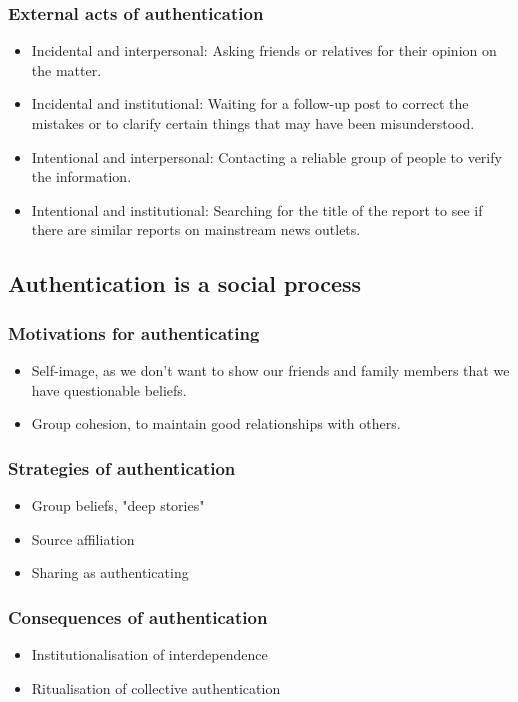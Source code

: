 \documentclass[11pt]{article}
\begin{document}
\subsubsection{External acts of authentication}
\label{sec:org8efaaed}
\begin{itemize}
\item Incidental and interpersonal: Asking friends or relatives for their opinion on the matter.
\item Incidental and institutional: Waiting for a follow-up post to correct the mistakes or to clarify certain things that may have been misunderstood.
\item Intentional and interpersonal: Contacting a reliable group of people to verify the information.
\item Intentional and institutional: Searching for the title of the report to see if there are similar reports on mainstream news outlets.
\end{itemize}
\subsection{Authentication is a social process}
\label{sec:orgf66a9f2}

\subsubsection{Motivations for authenticating}
\label{sec:org5487a06}
\begin{itemize}
\item Self-image, as we don't want to show our friends and family members that we have questionable beliefs.
\item Group cohesion, to maintain good relationships with others.
\end{itemize}
\subsubsection{Strategies of authentication}
\label{sec:org873158e}
\begin{itemize}
\item Group beliefs, "deep stories"
\item Source affiliation
\item Sharing as authenticating
\end{itemize}
\subsubsection{Consequences of authentication}
\label{sec:org3e48371}
\begin{itemize}
\item Institutionalisation of interdependence
\item Ritualisation of collective authentication
\end{itemize}
\end{document}
